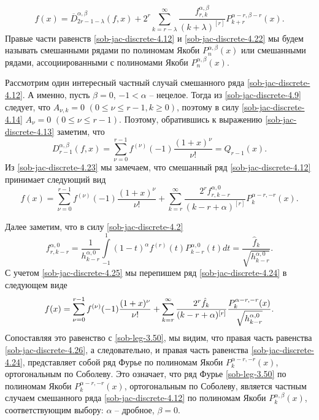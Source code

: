 \begin{equation}\label{sob-jac-discrete-4.22}
f(x)=\overline{D}^{\alpha,\beta}_{2r-1-\lambda}(f,x)+2^r\sum_{k=r-\lambda}^\infty
\frac{f^{\alpha,\beta}_{r,k}}{(k+\lambda)^{[r]}}P_{k+r}^{\alpha-r,\beta-r}(x).
\end{equation}
Правые части равенств \eqref{sob-jac-discrete-4.12} и \eqref{sob-jac-discrete-4.22} мы будем называть смешанными
рядами по полиномам Якоби $P_n^{\alpha,\beta}(x)$ или смешанными
рядами, ассоциированными с полиномами Якоби $P_n^{\alpha,\beta}(x)$.

Рассмотрим один интересный частный случай смешанного ряда \eqref{sob-jac-discrete-4.12}. А именно, пусть $\beta=0$, $-1<\alpha$ -- нецелое. Тогда из \eqref{sob-jac-discrete-4.9} следует, что $A_{\nu,k}=0$ $(0\le \nu \le r-1, k\ge0)$, поэтому в силу \eqref{sob-jac-discrete-4.14} $A_\nu=0$ $(0\le \nu \le r-1)$. Поэтому, обратившись  к выражению \eqref{sob-jac-discrete-4.13} заметим, что
\begin{equation}\label{sob-jac-discrete-4.23}
D^{\alpha,\beta}_{r-1}(f,x)=\sum^{r-1}_{\nu=0}f^{(\nu)}(-1)\frac{(1+x)^\nu}{\nu!}=Q_{r-1}(x).
\end{equation}
Из \eqref{sob-jac-discrete-4.23}  мы замечаем, что смешанный ряд  \eqref{sob-jac-discrete-4.12} принимает следующий вид
\begin{equation}\label{sob-jac-discrete-4.24}
f(x)=\sum^{r-1}_{\nu=0}f^{(\nu)}(-1)\frac{(1+x)^\nu}{\nu!}
+\sum_{k=r}^\infty\frac{2^rf^{\alpha,0}_{r,k-r}}{(k-r+\alpha)^{[r]}}P_{k}^{\alpha-r,-r}(x).
\end{equation}

Далее заметим, что в силу \eqref{sob-jac-discrete-4.2}
\begin{equation}\label{sob-jac-discrete-4.25}
f^{\alpha,0}_{r,k-r}=\frac{1}{h^{\alpha,0}_{k-r}}\int\limits^1_{-1}(1-t)^\alpha f^{(r)}(t)P_{k-r}^{\alpha,0}(t)dt=
\frac{\hat f_k}{\sqrt{h^{\alpha,0}_{k-r}}}.
\end{equation}
С учетом  \eqref{sob-jac-discrete-4.25} мы перепишем ряд \eqref{sob-jac-discrete-4.24} в следующем виде
\begin{equation}\label{sob-jac-discrete-4.26}
f(x)=\sum^{r-1}_{\nu=0}f^{(\nu)}(-1)\frac{(1+x)^\nu}{\nu!}
+\sum_{k=r}^\infty\frac{2^r\hat f_k}{(k-r+\alpha)^{[r]}}{P_{k}^{\alpha-r,-r}(x)\over\sqrt{h^{\alpha,0}_{k-r}}}.
\end{equation}
Сопоставляя это равенство с  \eqref{sob-leg-3.50}, мы видим, что правая часть равенства \eqref{sob-jac-discrete-4.26}, а следовательно, и правая часть равенства \eqref{sob-jac-discrete-4.24},   представляет собой  ряд Фурье по полиномам Якоби $P_{k}^{\alpha-r,-r}(x)$, ортогональным по Соболеву. Это означает, что ряд
Фурье  \eqref{sob-leg-3.50} по полиномам Якоби $P_{k}^{\alpha-r,-r}(x)$, ортогональным по Соболеву,
является частным случаем  смешанного ряда  \eqref{sob-jac-discrete-4.12}  по полиномам Якоби $P_{k}^{\alpha,\beta}(x)$, соответствующим выбору:  $\alpha$ -- дробное, $\beta=0$.

